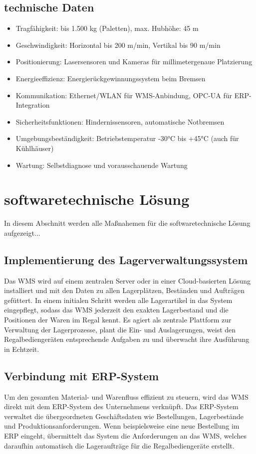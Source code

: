 \subsection{technische Daten}
\begin{itemize}
	\item Tragfähigkeit: bis 1.500 kg (Paletten), max. Hubhöhe: 45 m
	\item Geschwindigkeit: Horizontal bis 200 m/min, Vertikal bis 90 m/min
	\item Positionierung: Lasersensoren und Kameras für millimetergenaue Platzierung
	\item Energieeffizienz: Energierückgewinnungssystem beim Bremsen
	\item Kommunikation: Ethernet/WLAN für WMS-Anbindung, OPC-UA für ERP-Integration
	\item Sicherheitsfunktionen: Hindernissensoren, automatische Notbremsen
	\item Umgebungsbeständigkeit: Betriebstemperatur -30°C bis +45°C (auch für Kühlhäuser)
	\item Wartung: Selbstdiagnose und vorausschauende Wartung
\end{itemize}


\section{softwaretechnische Lösung}
In diesem Abschnitt werden alle Maßnahemen für die softwaretechnische Lösung aufgezeigt...
\subsection{Implementierung des Lagerverwaltungssystem}
Das WMS wird auf einem zentralen Server oder in einer Cloud-basierten Lösung installiert und mit den Daten zu allen Lagerplätzen, Beständen und Aufträgen gefüttert. In einem initialen Schritt werden alle Lagerartikel in das System eingepflegt, sodass das WMS jederzeit den exakten Lagerbestand und die Positionen der Waren im Regal kennt. Es agiert als zentrale Plattform zur Verwaltung der Lagerprozesse, plant die Ein- und Auslagerungen, weist den Regalbediengeräten entsprechende Aufgaben zu und überwacht ihre Ausführung in Echtzeit.

\subsection{Verbindung mit ERP-System}
Um den gesamten Material- und Warenfluss effizient zu steuern, wird das WMS direkt mit dem ERP-System des Unternehmens verknüpft. Das ERP-System verwaltet die übergeordneten Geschäftsdaten wie Bestellungen, Lagerbestände und Produktionsanforderungen. Wenn beispielsweise eine neue Bestellung im ERP eingeht, übermittelt das System die Anforderungen an das WMS, welches daraufhin automatisch die Lageraufträge für die Regalbediengeräte erstellt.

